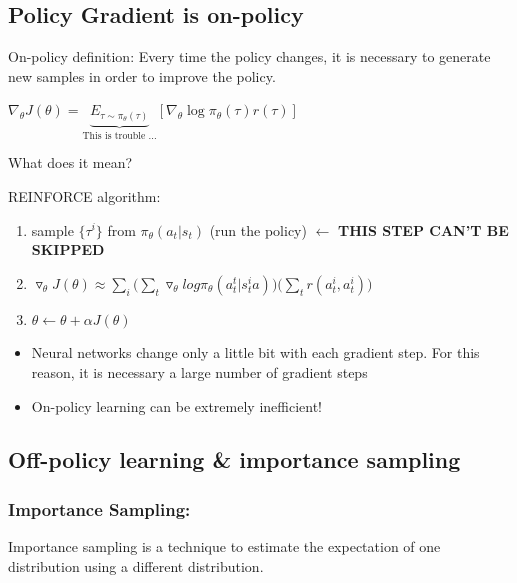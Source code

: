 \documentclass[]{article}
\begin{document}
\subsection*{Policy Gradient is on-policy}%
\label{sub:Policy Gradient is on-policy}

On-policy definition: Every time the policy changes, it is necessary to generate new samples in order to improve the
policy.

$\nabla_{\theta} J(\theta)=\underbrace{E_{\tau \sim \pi_{\theta}(\tau)}}_{\text{This is trouble ...}}\left[\nabla_{\theta} \log \pi_{\theta}(\tau)
r(\tau)\right]$

What does it mean?

REINFORCE algorithm:
\begin{enumerate}
    \item sample $\{\tau^{i}\}$ from $\pi_{\theta}(a_t|s_t)$ (run the policy) $\leftarrow$ \textbf{THIS STEP CAN'T BE
        SKIPPED} 
    \item $\triangledown_{\theta}J(\theta) \approx
        \sum_{i}\big(\sum_{t}\triangledown_{\theta}log\pi_{\theta}(a_{t}^{t}|s_{t}^{i}a)\big)\big(\sum_{t}r(a_{t}^{i},a_{t}^{i})\big)$
    \item $ \theta \leftarrow \theta + \alpha J(\theta)$
\end{enumerate}

\begin{itemize}
    \item Neural networks change only a little bit with each gradient step. For this reason, it is necessary a large
        number of gradient steps
    \item On-policy learning can be extremely inefficient!
\end{itemize}

\subsection*{Off-policy learning \& importance sampling}
\label{sub:Off-policy learning importance sampling}

\subsubsection*{Importance Sampling:}
\label{sub:Importance Sampling}

\par Importance sampling is a technique to estimate the expectation of one distribution using a different
distribution.
\end{document}
